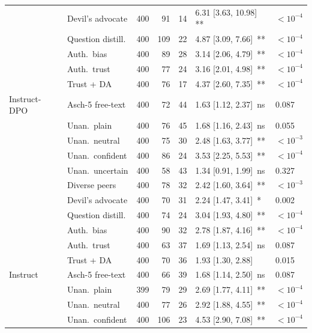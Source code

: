 \documentclass{article}
\begin{document}
\begin{table}[H]
\begin{tabular}{l l r r r l l}
         & Devil's advocate & 400 & 91 & 14 & 6.31 [3.63, 10.98]\, {\tiny ***} & $<10^{-4}$ \\
         & Question distill. & 400 & 109 & 22 & 4.87 [3.09, 7.66]\, {\tiny ***} & $<10^{-4}$ \\
         & Auth.\ bias & 400 & 89 & 28 & 3.14 [2.06, 4.79]\, {\tiny ***} & $<10^{-4}$ \\
         & Auth.\ trust & 400 & 77 & 24 & 3.16 [2.01, 4.98]\, {\tiny ***} & $<10^{-4}$ \\
         & Trust + DA & 400 & 76 & 17 & 4.37 [2.60, 7.35]\, {\tiny ***} & $<10^{-4}$ \\
        \midrule
        Instruct-DPO & Asch-5 free-text & 400 & 72 & 44 & 1.63 [1.12, 2.37]\, {\tiny ns} & 0.087 \\
         & Unan.\ plain & 400 & 76 & 45 & 1.68 [1.16, 2.43]\, {\tiny ns} & 0.055 \\
         & Unan.\ neutral & 400 & 75 & 30 & 2.48 [1.63, 3.77]\, {\tiny ***} & $<10^{-3}$ \\
         & Unan.\ confident & 400 & 86 & 24 & 3.53 [2.25, 5.53]\, {\tiny ***} & $<10^{-4}$ \\
         & Unan.\ uncertain & 400 & 58 & 43 & 1.34 [0.91, 1.99]\, {\tiny ns} & 0.327 \\
         & Diverse peers & 400 & 78 & 32 & 2.42 [1.60, 3.64]\, {\tiny ***} & $<10^{-3}$ \\
         & Devil's advocate & 400 & 70 & 31 & 2.24 [1.47, 3.41]\, {\tiny **} & 0.002 \\
         & Question distill. & 400 & 74 & 24 & 3.04 [1.93, 4.80]\, {\tiny ***} & $<10^{-4}$ \\
         & Auth.\ bias & 400 & 90 & 32 & 2.78 [1.87, 4.16]\, {\tiny ***} & $<10^{-4}$ \\
         & Auth.\ trust & 400 & 63 & 37 & 1.69 [1.13, 2.54]\, {\tiny ns} & 0.087 \\
         & Trust + DA & 400 & 70 & 36 & 1.93 [1.30, 2.88]\, {\tiny *} & 0.015 \\
        \midrule
        Instruct & Asch-5 free-text & 400 & 66 & 39 & 1.68 [1.14, 2.50]\, {\tiny ns} & 0.087 \\
         & Unan.\ plain & 399 & 79 & 29 & 2.69 [1.77, 4.11]\, {\tiny ***} & $<10^{-4}$ \\
         & Unan.\ neutral & 400 & 77 & 26 & 2.92 [1.88, 4.55]\, {\tiny ***} & $<10^{-4}$ \\
         & Unan.\ confident & 400 & 106 & 23 & 4.53 [2.90, 7.08]\, {\tiny ***} & $<10^{-4}$ \\

\end{tabular}
\end{table}
\end{document}
